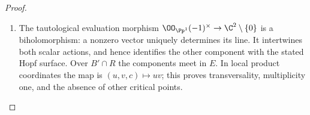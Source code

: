 \begin{proof}
\begin{enumerate}[label={$\langle1\rangle$\arabic*.},leftmargin=*]
\item The tautological evaluation morphism
$\OO_{\Pp^1}(-1)^\times\to\C^2\setminus\{0\}$ is a biholomorphism: a
nonzero vector uniquely determines its line. It intertwines both scalar
actions, and hence identifies the other component with the stated Hopf
surface. Over $B'\cap R$ the components meet in $E$. In local product
coordinates the map is $(u,v,c)\mapsto uv$; this proves transversality,
multiplicity one, and the absence of other critical points.

\end{enumerate}
\end{proof}
